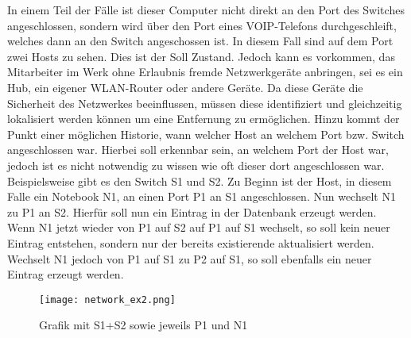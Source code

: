 In einem Teil der Fälle ist dieser Computer nicht direkt an den Port des Switches angeschlossen, sondern wird über den Port eines VOIP-Telefons durchgeschleift, welches dann an den Switch angeschossen ist.
In diesem Fall sind auf dem Port zwei Hosts zu sehen.
Dies ist der Soll Zustand. Jedoch kann es vorkommen, das Mitarbeiter im Werk ohne Erlaubnis fremde Netzwerkgeräte anbringen, sei es ein Hub, ein eigener WLAN-Router oder andere Geräte. Da diese Geräte die Sicherheit des Netzwerkes beeinflussen, müssen diese identifiziert und gleichzeitig lokalisiert werden können um eine Entfernung zu ermöglichen.
Hinzu kommt der Punkt einer möglichen Historie, wann welcher Host an welchem Port bzw. Switch angeschlossen war. Hierbei soll erkennbar sein, an welchem Port der Host war, jedoch ist es nicht notwendig zu wissen wie oft dieser dort angeschlossen war. Beispielsweise gibt es den Switch S1 und S2. Zu Beginn ist der Host, in diesem Falle ein Notebook N1, an einen Port P1 an S1 angeschlossen.
Nun wechselt N1 zu P1 an S2.
Hierfür soll nun ein Eintrag in der Datenbank erzeugt werden. Wenn N1 jetzt wieder von P1 auf S2 auf P1 auf S1 wechselt, so soll kein neuer Eintrag entstehen, sondern nur der bereits existierende aktualisiert werden. Wechselt N1 jedoch von P1 auf S1 zu P2 auf S1, so soll ebenfalls ein neuer Eintrag erzeugt werden.\\

\begin{figure}[H]
\centering
\texttt{[image: network\_ex2.png]}
\caption{Grafik mit S1+S2 sowie jeweils P1 und N1}
\label{fig:show_s1_s2_p1_n1}
\end{figure}


